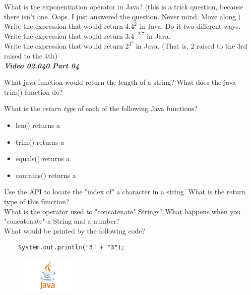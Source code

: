\documentclass[letterpaper,11pt]{exam}
\newcommand{\videoheading}[1]{\Large\textbf{\textit{#1}}}
\begin{document}
\begin{questions}
\question What is the exponentiation operator in Java?  (this is a trick question, because there isn't one.  Oops.  I just answered the question.  Never mind.  Move along.)
\question Write the expression that would return $4.4^2$ in Java.  Do it two different ways.
\\
\question Write the expression that would return $3.4^{-2.7}$ in Java.
\\
\question Write the expression that would return $2^{3^4}$ in Java.  (That is, 2 raised to the 3rd raised to the 4th)
\\
\videoheading{Video 02.040 Part 04}

\question What java function would return the length of a string? \makebox[2cm]{\hrulefill}
\question What does the java trim() function do?
\\
\begin{samepage}
\question What is the \textit{return type} of each of the following Java functions?
\begin{itemize}
  \item len() returns a \makebox[2cm]{\hrulefill}
  \item trim() returns a \makebox[2cm]{\hrulefill}
  \item equals() returns a \makebox[2cm]{\hrulefill}
  \item contains() returns a \makebox[2cm]{\hrulefill}
\end{itemize}
\end{samepage}
\question Use the API to locate the "index of" a character in a string.  What is the return type of this function?
\\
\question What is the operator used to "concatenate" Strings? \makebox[2cm]{\hrulefill}
\question What happens when you "concatenate" a String and a number?
\\
\question What would be printed by the following code?
\begin{verbatim}
    System.out.println("3" + "3");
\end{verbatim}
\end{questions}
\begin{figure}[b]\label{end}
	\center
	\includegraphics[width=1in]{java}
\end{figure}
\end{document}
